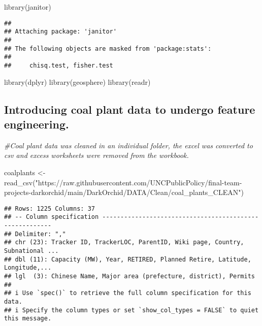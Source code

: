 \documentclass[
]{article}
\newenvironment{Shaded}{\begin{snugshade}}{\end{snugshade}}
\newcommand{\CommentTok}[1]{\textcolor[rgb]{0.56,0.35,0.01}{\textit{#1}}}
\newcommand{\FunctionTok}[1]{\textcolor[rgb]{0.00,0.00,0.00}{#1}}
\newcommand{\NormalTok}[1]{#1}
\newcommand{\OtherTok}[1]{\textcolor[rgb]{0.56,0.35,0.01}{#1}}
\newcommand{\StringTok}[1]{\textcolor[rgb]{0.31,0.60,0.02}{#1}}
\begin{document}
\begin{Shaded}
\begin{Highlighting}[]
\FunctionTok{library}\NormalTok{(janitor)}
\end{Highlighting}
\end{Shaded}

\begin{verbatim}
## 
## Attaching package: 'janitor'
## 
## The following objects are masked from 'package:stats':
## 
##     chisq.test, fisher.test
\end{verbatim}

\begin{Shaded}
\begin{Highlighting}[]
\FunctionTok{library}\NormalTok{(dplyr)}
\FunctionTok{library}\NormalTok{(geosphere)}
\FunctionTok{library}\NormalTok{(readr)}
\end{Highlighting}
\end{Shaded}

\hypertarget{introducing-coal-plant-data-to-undergo-feature-engineering.}{%
\subsection{Introducing coal plant data to undergo feature
engineering.}\label{introducing-coal-plant-data-to-undergo-feature-engineering.}}

\begin{Shaded}
\begin{Highlighting}[]
\CommentTok{\#Coal plant data was cleaned in an individual folder, the excel was converted to csv and excess worksheets were removed from the workbook. }

\NormalTok{coalplants }\OtherTok{\textless{}{-}} \FunctionTok{read\_csv}\NormalTok{(}\StringTok{"https://raw.githubusercontent.com/UNCPublicPolicy/final{-}team{-}projects{-}darkorchid/main/DarkOrchid/DATA/Clean/coal\_plants\_CLEAN"}\NormalTok{)}
\end{Highlighting}
\end{Shaded}

\begin{verbatim}
## Rows: 1225 Columns: 37
## -- Column specification --------------------------------------------------------
## Delimiter: ","
## chr (23): Tracker ID, TrackerLOC, ParentID, Wiki page, Country, Subnational ...
## dbl (11): Capacity (MW), Year, RETIRED, Planned Retire, Latitude, Longitude,...
## lgl  (3): Chinese Name, Major area (prefecture, district), Permits
## 
## i Use `spec()` to retrieve the full column specification for this data.
## i Specify the column types or set `show_col_types = FALSE` to quiet this message.
\end{verbatim}
\end{document}
